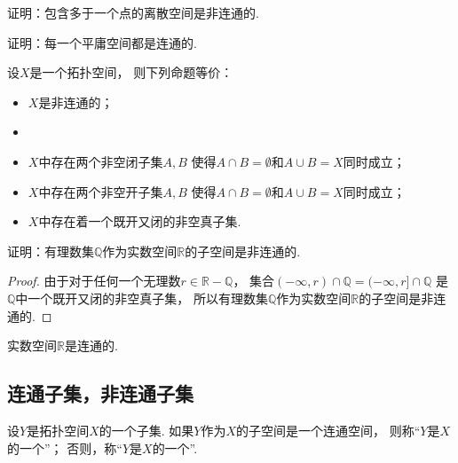 \begin{example}
证明：包含多于一个点的离散空间是非连通的.
\end{example}

\begin{example}
证明：每一个平庸空间都是连通的.
\end{example}

\begin{theorem}
设\(X\)是一个拓扑空间，
则下列命题等价：\begin{itemize}
	\item \(X\)是非连通的；
	\item
	\item \(X\)中存在两个非空闭子集\(A,B\)
	使得\(A \cap B = \emptyset\)和\(A \cup B = X\)同时成立；

	\item \(X\)中存在两个非空开子集\(A,B\)
	使得\(A \cap B = \emptyset\)和\(A \cup B = X\)同时成立；

	\item \(X\)中存在着一个既开又闭的非空真子集.
\end{itemize}
\end{theorem}

\begin{example}
证明：有理数集\(\mathbb{Q}\)作为实数空间\(\mathbb{R}\)的子空间是非连通的.
\begin{proof}
由于对于任何一个无理数\(r \in \mathbb{R}-\mathbb{Q}\)，
集合\((-\infty,r)\cap\mathbb{Q}
= (-\infty,r]\cap\mathbb{Q}\)
是\(\mathbb{Q}\)中一个既开又闭的非空真子集，
所以有理数集\(\mathbb{Q}\)作为实数空间\(\mathbb{R}\)的子空间是非连通的.
\end{proof}
\end{example}

\begin{theorem}\label{theorem:连通空间.实数空间是连通空间}
实数空间\(\mathbb{R}\)是连通的.
\end{theorem}

\subsection{连通子集，非连通子集}
\begin{definition}
设\(Y\)是拓扑空间\(X\)的一个子集.
如果\(Y\)作为\(X\)的子空间是一个连通空间，
则称“\(Y\)是\(X\)的一个”；
否则，称“\(Y\)是\(X\)的一个”.
\end{definition}

